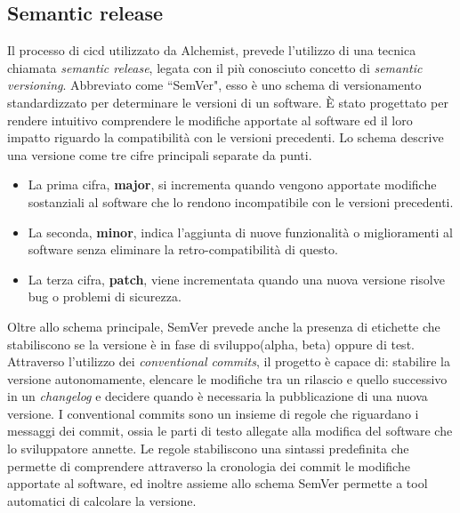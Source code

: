 \subsection{Semantic release}
Il processo di \ac{cicd} utilizzato da Alchemist, prevede l'utilizzo di una tecnica chiamata \textit{semantic release}, legata con il più conosciuto concetto di \textit{semantic versioning}. Abbreviato come ``SemVer", esso è uno schema di versionamento standardizzato per determinare le versioni di un software. È stato progettato per rendere intuitivo comprendere le modifiche apportate al software ed il loro impatto riguardo la compatibilità con le versioni precedenti. Lo schema descrive una versione come tre cifre principali separate da punti.
\begin{itemize}
	\item La prima cifra, \textbf{major}, si incrementa quando vengono apportate modifiche sostanziali al software che lo rendono incompatibile con le versioni precedenti.
	\item La seconda, \textbf{minor}, indica l'aggiunta di nuove funzionalità o miglioramenti al software senza eliminare la retro-compatibilità di questo.
	\item La terza cifra, \textbf{patch}, viene incrementata quando una nuova versione risolve bug o problemi di sicurezza.
\end{itemize}
Oltre allo schema principale, SemVer prevede anche la presenza di etichette che stabiliscono se la versione è in fase di sviluppo(alpha, beta) oppure di test.
Attraverso l'utilizzo dei \textit{conventional commits}, il progetto è capace di: stabilire la versione autonomamente, elencare le modifiche tra un rilascio e quello successivo in un \textit{changelog} e decidere quando è necessaria la pubblicazione di una nuova versione. I conventional commits sono un insieme di regole che riguardano i messaggi dei commit, ossia le parti di testo allegate alla modifica del software che lo sviluppatore annette. Le regole stabiliscono una sintassi predefinita che permette di comprendere attraverso la cronologia dei commit le modifiche apportate al software, ed inoltre assieme allo schema SemVer permette a tool automatici di calcolare la versione.

